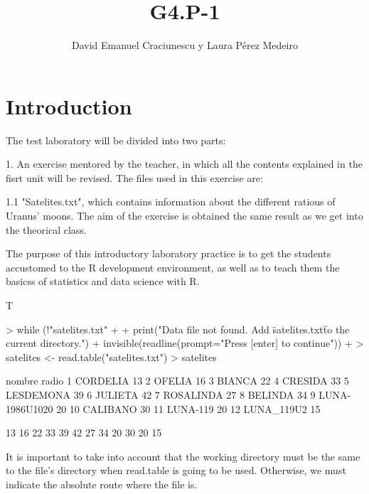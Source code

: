 \documentclass[a4paper]{article}
\title{G4.P-1}
\author{David Emanuel Craciunescu y Laura Pérez Medeiro}
\begin{document}
\maketitle

\section*{Introduction}
The test laboratory will be divided into two parts:

1. An exercise mentored by the teacher, in which all the contents explained
in the fisrt unit will be revised. The files used in this exercise are:

	1.1 "Satelites.txt", which contains information about the different ratious of Uranus' moons.
	The aim of the exercise is obtained the same result as we get into the theorical class. 
	
The purpose of this introductory laboratory practice is to get the students
accustomed to the R development environment, as well as to teach them the
basicss of statistics and data science with R.

T

\begin{Schunk}
\begin{Sinput}
> while (!"satelites.txt" %in% list.files(getwd()))
+ {
+   print("Data file not found. Add \"satelites.txt\" to the current directory.")
+   invisible(readline(prompt="Press [enter] to continue"))
+ }
> 	satelites <- read.table("satelites.txt")
> 	satelites
\end{Sinput}
\begin{Soutput}
           nombre radio
1        CORDELIA    13
2          OFELIA    16
3          BIANCA    22
4         CRESIDA    33
5       LESDEMONA    39
6         JULIETA    42
7       ROSALINDA    27
8         BELINDA    34
9  LUNA-1986U1020    20
10       CALIBANO    30
11       LUNA-119    20
12     LUNA_119U2    15
\end{Soutput}
\begin{Soutput}
 [1] 13 16 22 33 39 42 27 34 20 30 20 15
\end{Soutput}
\end{Schunk}

It is important to take into account that the working directory must be the same to the file's
directory when read.table is going to be used. Otherwise, we must indicate the absolute route where
the file is.
	
\end{document}
